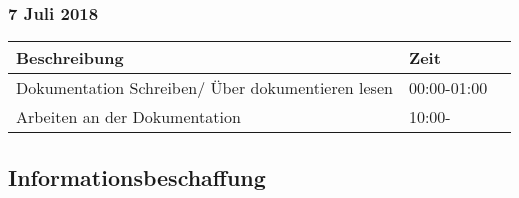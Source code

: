 \documentclass[a4paper, 11pt]{article}
\begin{document}
\subsubsection{7 Juli 2018}

\begin{tabular}{llr}
\toprule
Beschreibung & Zeit \\
\midrule
Dokumentation Schreiben/ Über dokumentieren lesen & 00:00-01:00 \\
Arbeiten an der Dokumentation & 10:00- \\
\bottomrule
\end{tabular}

\subsection{Informationsbeschaffung}
\end{document}
